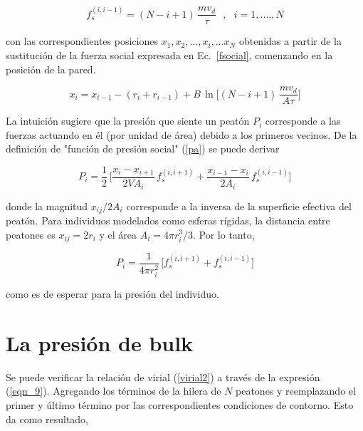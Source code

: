 \begin{equation}
f_s^{(i,i-1)}=(N-i+1)\,\displaystyle\frac{mv_d}{\tau}\ \ \ , \ \ \ 
i=1,....,N\label{eqn_7}
\end{equation}

\noindent con las correspondientes posiciones  $x_1,x_2,...,x_{i},...x_N$ obtenidas a partir de la sustitución de la fuerza social expresada en Ec.~\ref{fsocial}, comenzando en la posición de la pared.

\begin{equation} 
x_i=x_{i-1}-(r_{i}+r_{i-1})+B\,\ln\bigg[(N-i+1)\,\displaystyle\frac{mv_d}{A\tau}
\bigg]\label{eqn_8}
\end{equation}

La intuición sugiere que la presión que siente un peatón $P_i$ 
corresponde a las fuerzas actuando en él (por unidad de área) debido a los primeros vecinos. De la definición de "función de presión social" (\ref{pa}) se puede derivar

\begin{equation}
P_i=\displaystyle\frac{1}{2}\,\bigg[\displaystyle\frac{x_{i}-x_{i+1}}{2VA_i}\,
f_s^ { (i , i+1) } +\displaystyle\frac { x_ {i-1}-x_{i}}{2A_i}\,f_s^{(i,i-1) 
}\bigg]\label{eqn_9}
\end{equation}

\vspace{3mm}

\noindent donde la magnitud $x_{ij}/2A_i$ corresponde a la inversa de la superficie efectiva del peatón. Para individuos modelados como esferas rígidas, la distancia entre peatones es $x_{ij}=2r_i$ y el área $A_i=4\pi r_i^3/3$. Por lo tanto, 

\begin{equation}
P_i=\displaystyle\frac{1}{4\pi 
r_i^2}\,\bigg[f_s^ { (i , i+1) } +f_s^{(i,i-1)}\bigg]\label{eqn_10}
\end{equation}

\noindent como es de esperar para la presión del individuo.  \\

\section{\label{bulk_pressure}La presión de bulk}

Se puede verificar la relación de virial (\ref{virial2}) a través de la expresión (\ref{eqn_9}). Agregando los términos de la hilera de $N$ peatones y reemplazando el primer y último término por las correspondientes condiciones de contorno. Esto da como resultado,


